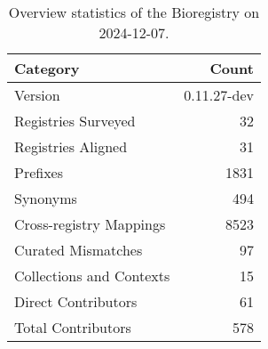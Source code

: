 \begin{table}
\caption{Overview statistics of the Bioregistry on 2024-12-07.}
\label{tab:bioregistry-summary}
\begin{tabular}{lr}
\toprule
Category & Count \\
\midrule
Version & 0.11.27-dev \\
Registries Surveyed & 32 \\
Registries Aligned & 31 \\
Prefixes & 1831 \\
Synonyms & 494 \\
Cross-registry Mappings & 8523 \\
Curated Mismatches & 97 \\
Collections and Contexts & 15 \\
Direct Contributors & 61 \\
Total Contributors & 578 \\
\bottomrule
\end{tabular}
\end{table}
